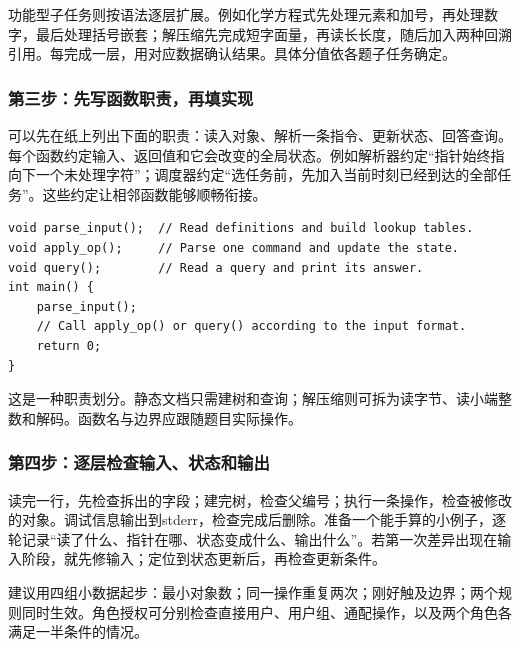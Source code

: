 \documentclass[UTF8,11pt,a4paper,fontset=none]{ctexart}
\begin{document}
功能型子任务则按语法逐层扩展。例如化学方程式先处理元素和加号，再处理数字，最后处理括号嵌套；解压缩先完成短字面量，再读长长度，随后加入两种回溯引用。每完成一层，用对应数据确认结果。具体分值依各题子任务确定。

\subsubsection{第三步：先写函数职责，再填实现}
可以先在纸上列出下面的职责：读入对象、解析一条指令、更新状态、回答查询。每个函数约定输入、返回值和它会改变的全局状态。例如解析器约定“指针始终指向下一个未处理字符”；调度器约定“选任务前，先加入当前时刻已经到达的全部任务”。这些约定让相邻函数能够顺畅衔接。
\par\noindent\begin{minipage}{\linewidth}
\begin{lstlisting}
void parse_input();  // Read definitions and build lookup tables.
void apply_op();     // Parse one command and update the state.
void query();        // Read a query and print its answer.
int main() {
    parse_input();
    // Call apply_op() or query() according to the input format.
    return 0;
}
\end{lstlisting}
\end{minipage}\par
这是一种职责划分。静态文档只需建树和查询；解压缩则可拆为读字节、读小端整数和解码。函数名与边界应跟随题目实际操作。

\subsubsection{第四步：逐层检查输入、状态和输出}
读完一行，先检查拆出的字段；建完树，检查父编号；执行一条操作，检查被修改的对象。调试信息输出到stderr，检查完成后删除。准备一个能手算的小例子，逐轮记录“读了什么、指针在哪、状态变成什么、输出什么”。若第一次差异出现在输入阶段，就先修输入；定位到状态更新后，再检查更新条件。

建议用四组小数据起步：最小对象数；同一操作重复两次；刚好触及边界；两个规则同时生效。角色授权可分别检查直接用户、用户组、通配操作，以及两个角色各满足一半条件的情况。
\end{document}
